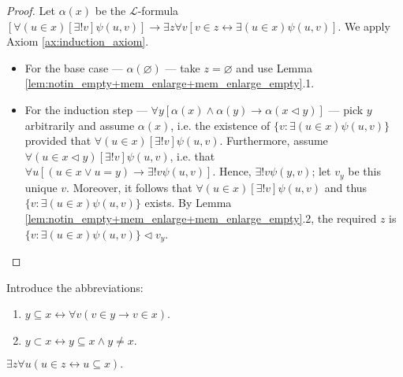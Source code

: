 \begin{proof}
    \leanok
    Let $\alpha (x)$ be the $\mathcal{L}$-formula 
    $[\forall (u \in x) [\exists! v] \psi (u,v)]\rightarrow 
    \exists z \forall v [v\in z \leftrightarrow \exists(u \in x) \psi (u,v)]$.
    We apply Axiom \ref{ax:induction_axiom}.
    \begin{itemize}
        \item For the base case — $\alpha (\varnothing)$ — take $z=\varnothing$ and use 
        Lemma \ref{lem:notin_empty+mem_enlarge+mem_enlarge_empty}.1.
        \item For the induction step 
        — $\forall y[\alpha(x) \land \alpha(y) \rightarrow \alpha(x \lhd y)]$ — 
        pick $y$ arbitrarily and assume $\alpha(x)$, i.e. the existence of 
        $\{v : \exists (u\in x)\psi(u,v)\}$ provided that 
        $\forall (u \in x) [\exists! v] \psi (u,v)$.
        Furthermore, assume $\forall (u \in x \lhd y) [\exists! v] \psi (u,v)$, 
        i.e. that $\forall u [(u \in x \lor u = y) \rightarrow \exists! v \psi (u,v)]$.
        Hence, $\exists! v \psi (y,v)$; let $v_y$ be this unique $v$. 
        Moreover, it follows that $\forall (u \in x) [\exists! v] \psi (u,v)$ and 
        thus $\{v : \exists (u\in x)\psi(u,v)\}$ exists.
        By Lemma \ref{lem:notin_empty+mem_enlarge+mem_enlarge_empty}.2, 
        the required $z$ is $\{v : \exists (u\in x)\psi(u,v)\} \lhd v_y$.
    \end{itemize}
\end{proof}

\begin{definition}
    \label{def:Subset+SSubset}
    \leanok
    Introduce the abbreviations:
    \begin{enumerate}
        \item $y \subseteq x \leftrightarrow \forall v (v\in y \rightarrow v \in x)$.
        \item $y \subset x \leftrightarrow y \subseteq x \land y \neq x$.
    \end{enumerate}  
\end{definition}

\begin{theorem}
    \label{thm:exists_powerset}
    \leanok
    $\exists z \forall u (u\in z \leftrightarrow u \subseteq x).$
\end{theorem}

